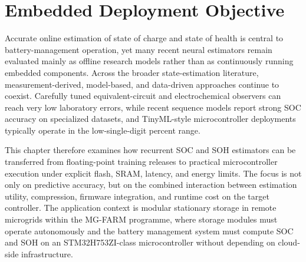 \documentclass[
    a4paper,
    12pt,
    titlepage,
    bibliography=totoc,
    twoside=on,
    parskip=false,
    numbers=noenddot,
    cleardoublepage=empty,
    DIV=12,
    BCOR=12.0mm,
    headheight=36pt,
    headings=openright
]{scrreprt}
\begin{document}
\section{Embedded Deployment Objective}
Accurate online estimation of state of charge and state of health is central to battery-management operation, yet many recent neural estimators remain evaluated mainly as offline research models rather than as continuously running embedded components.\autocite{yaoSmarterBatteryManagement2025a,a.m.s.m.h.s.attanayakaEstimationStateCharge2019,berecibarCriticalReviewState2016,shrivastavaReviewTechnologicalAdvancement2023} Across the broader state-estimation literature, measurement-derived, model-based, and data-driven approaches continue to coexist.\autocite{a.m.s.m.h.s.attanayakaEstimationStateCharge2019,berecibarCriticalReviewState2016,shrivastavaReviewTechnologicalAdvancement2023,guoSystematicReviewElectrochemical2024} Carefully tuned equivalent-circuit and electrochemical observers can reach very low laboratory errors,\autocite{gaoCoEstimationStateofChargeStateof2022,gaoEnhancedStateofchargeEstimation2022,shenAlternativeCombinedCoestimation2022,wangFusionEstimationLithiumion2022} while recent sequence models report strong SOC accuracy on specialized datasets,\autocite{sunStateChargeEstimation2023,sunStateofchargeEstimationSodiumion2024} and TinyML-style microcontroller deployments typically operate in the low-single-digit percent range.\autocite{crocioniLiIonBatteriesParameter2020,giazitzisCaseStudyTiny2024,Embedded_AI_only_SOC_mobile}

This chapter therefore examines how recurrent SOC and SOH estimators can be transferred from floating-point training releases to practical microcontroller execution under explicit flash, SRAM, latency, and energy limits. The focus is not only on predictive accuracy, but on the combined interaction between estimation utility, compression, firmware integration, and runtime cost on the target controller. The application context is modular stationary storage in remote microgrids within the MG-FARM programme, where storage modules must operate autonomously and the battery management system must compute SOC and SOH on an STM32H753ZI-class microcontroller without depending on cloud-side infrastructure.\autocite{leap-reMGFARMSmart,microenergyMGFARMPoweringSustainable,aqachtoulMGFARMIoTEdgeDriven2026,technischeuniversitatberlinMGFarmSmart}
\end{document}
